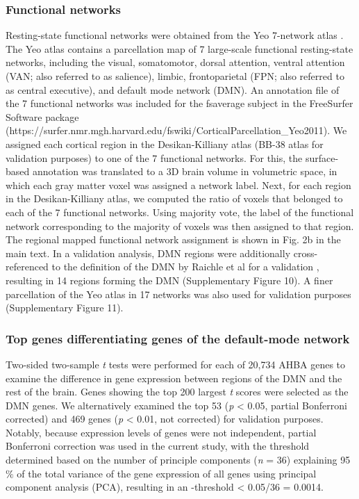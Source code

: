 \begin{refsection}
\subsubsection*{Functional networks}
Resting-state functional networks were obtained from the Yeo 7-network atlas \citep{thomas2011organization}. The Yeo atlas contains a parcellation map of 7 large-scale functional resting-state networks, including the visual, somatomotor, dorsal attention, ventral attention (VAN; also referred to as salience), limbic, frontoparietal (FPN; also referred to as central executive), and default mode network (DMN). An annotation file of the 7 functional networks was included for the fsaverage subject in the FreeSurfer Software package (https://surfer.nmr.mgh.harvard.edu/fswiki/CorticalParcellation\_Yeo2011). We assigned each cortical region in the Desikan-Killiany atlas \citep{CAMMOUN2012386,DESIKAN2006968} (BB-38 atlas for validation purposes) to one of the 7 functional networks. For this, the surface-based annotation was translated to a 3D brain volume in volumetric space, in which each gray matter voxel was assigned a network label. Next, for each region in the Desikan-Killiany atlas, we computed the ratio of voxels that belonged to each of the 7 functional networks. Using majority vote, the label of the functional network corresponding to the majority of voxels was then assigned to that region. The regional mapped functional network assignment is shown in Fig. 2b in the main text. In a validation analysis, DMN regions were additionally cross-referenced to the definition of the DMN by Raichle et al for a validation \citep{raichle2015brain}, resulting in 14 regions forming the DMN (Supplementary Figure 10). A finer parcellation of the Yeo atlas in 17 networks \citep{thomas2011organization} was also used for validation purposes (Supplementary Figure 11).

\subsubsection*{Top genes differentiating genes of the default-mode network}
Two-sided two-sample \textit{t} tests were performed for each of 20,734 AHBA genes to examine the difference in gene expression between regions of the DMN and the rest of the brain. Genes showing the top 200 largest \textit{t} scores were selected as the DMN genes. We alternatively examined the top 53 (\textit{p} < 0.05, partial Bonferroni corrected) and 469 genes (\textit{p} < 0.01, not corrected) for validation purposes. Notably, because expression levels of genes were not independent, partial Bonferroni correction \citep{Gao2008AMT,Li2005AdjustingMT,Shriner2008CommonalityOF} was used in the current study, with the threshold determined based on the number of principle components (\textit{n} = 36) explaining 95$\%$  of the total variance of the gene expression of all genes using principal component analysis (PCA), resulting in an \textit{\textalpha}-threshold < 0.05/36 = 0.0014.


\end{refsection}
